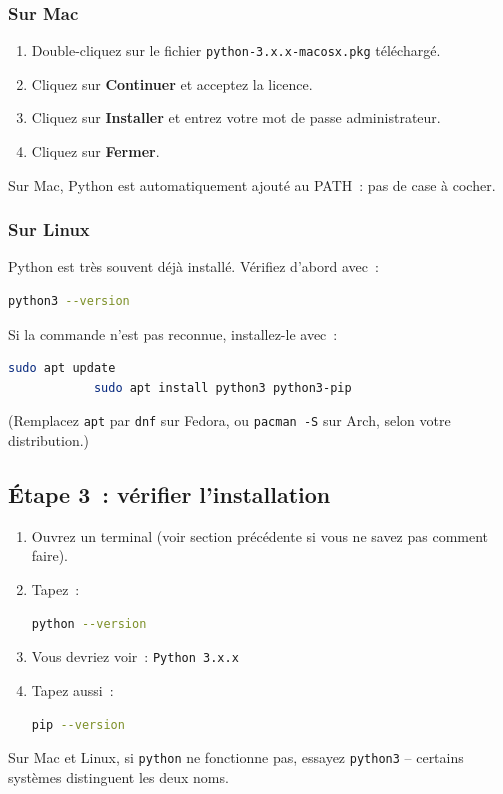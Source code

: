 \documentclass[12pt,a4paper]{article}
\begin{document}
	\subsubsection{Sur Mac}
	
	\begin{etape}
		\begin{enumerate}
			\item Double-cliquez sur le fichier \texttt{python-3.x.x-macosx.pkg} téléchargé.
			\item Cliquez sur \textbf{Continuer} et acceptez la licence.
			\item Cliquez sur \textbf{Installer} et entrez votre mot de passe administrateur.
			\item Cliquez sur \textbf{Fermer}.
		\end{enumerate}
		Sur Mac, Python est automatiquement ajouté au PATH~: pas de case à cocher.
	\end{etape}
	
	\subsubsection{Sur Linux}
	
	\begin{etape}
		Python est très souvent déjà installé. Vérifiez d'abord avec~:
		\begin{lstlisting}[language=bash]
			python3 --version
		\end{lstlisting}
		Si la commande n'est pas reconnue, installez-le avec~:
		\begin{lstlisting}[language=bash]
			sudo apt update
			sudo apt install python3 python3-pip
		\end{lstlisting}
		(Remplacez \texttt{apt} par \texttt{dnf} sur Fedora, ou \texttt{pacman -S} sur Arch, selon votre distribution.)
	\end{etape}
	
	\subsection{Étape 3~: vérifier l'installation}
	
	\begin{etape}
		\begin{enumerate}
			\item Ouvrez un terminal (voir section précédente si vous ne savez pas comment faire).
			\item Tapez~:
			\begin{lstlisting}[language=bash]
				python --version
			\end{lstlisting}
			\item Vous devriez voir~: \texttt{Python 3.x.x}
			\item Tapez aussi~:
			\begin{lstlisting}[language=bash]
				pip --version
			\end{lstlisting}
		\end{enumerate}
		Sur Mac et Linux, si \texttt{python} ne fonctionne pas, essayez \texttt{python3} -- certains systèmes distinguent les deux noms.
	\end{etape}
	
\end{document}
